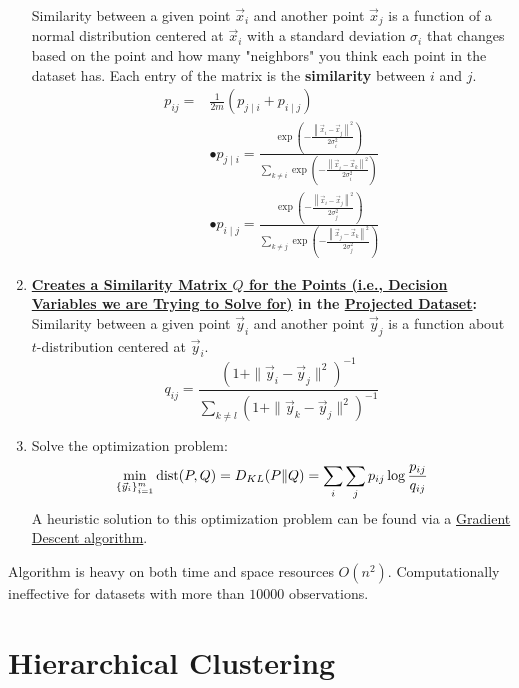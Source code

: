 \documentclass[11pt]{elegantbook}
\begin{document}
\begin{enumerate}
    Similarity between a given point $\vec{x}_i$ and another point $\vec{x}_j$ is a function of a normal distribution centered at $\vec{x}_i$ with a standard deviation $\sigma_i$ that changes based on the point and how many "neighbors" you think each point in the dataset has. Each entry of the matrix is the \textbf{similarity} between $i$ and $j$.
    \begin{equation}
        \begin{aligned}
        p_{i j}= & \frac{1}{2m}\left(p_{j \mid i}+p_{i \mid j}\right) \\
        & \bullet p_{j \mid i}=\frac{\exp \left(-\frac{\left\|\vec{x}_i-\vec{x}_j\right\|^2}{2 \sigma_i^2}\right)}{\sum_{k \neq i} \exp \left(-\frac{\left\|\vec{x}_i-\vec{x}_k\right\|^2}{2 \sigma_i^2}\right)} \\
        & \bullet p_{i \mid j}=\frac{\exp \left(-\frac{\left\|\vec{x}_i-\vec{x}_j\right\|^2}{2 \sigma_j^2}\right)}{\sum_{k \neq j} \exp \left(-\frac{\left\|\vec{x}_j-\vec{x}_k\right\|^2}{2 \sigma_j^2}\right)}
        \end{aligned}
        \nonumber
    \end{equation}
    \item \textbf{\underline{Creates a Similarity Matrix $Q$ for the Points (i.e., Decision Variables we are Trying to Solve for)} in the \underline{Projected Dataset}:} Similarity between a given point $\vec{y}_i$ and another point $\vec{y}_j$ is a function about $t$-distribution centered at $\vec{y}_i$.
    $$q_{ij}=\frac{(1+\|\vec{y}_i-\vec{y}_j\|^2)^{-1}}{\sum_{k\neq l}(1+\|\vec{y}_k-\vec{y}_j\|^2)^{-1}}$$
    \item Solve the optimization problem:
    \begin{equation}
        \begin{aligned}
            \min_{\{\vec{y}_i\}_{i=1}^m}\textnormal{dist}(P,Q)=D_{KL}(P\| Q)=\sum_i\sum_j p_{ij}\log\frac{p_{ij}}{q_{ij}}
        \end{aligned}
        \nonumber
    \end{equation}
    A heuristic solution to this optimization problem can be found via a \underline{Gradient Descent algorithm}.
\end{enumerate}


Algorithm is heavy on both time and space resources $O(n^2)$. Computationally ineffective for datasets with more than $10000$ observations.

\chapter{Hierarchical Clustering}
\end{document}
